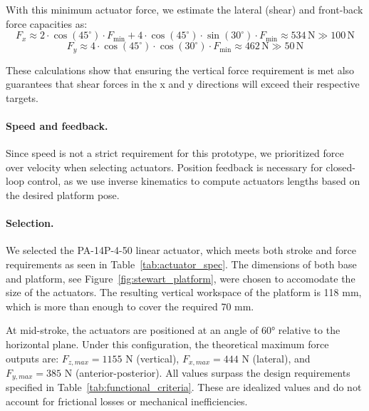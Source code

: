 With this minimum actuator force, we estimate the lateral (shear) and front-back force capacities as:
\begin{equation}
F_{x} \approx 2 \cdot \cos(45^\circ) \cdot F_{\text{min}} + 4 \cdot \cos(45^\circ) \cdot \sin(30^\circ) \cdot F_{\text{min}} \approx 534\,\text{N} \gg 100\,\text{N}
\end{equation}
\begin{equation}
F_{y} \approx 4 \cdot \cos(45^\circ) \cdot \cos(30^\circ) \cdot F_{\text{min}} \approx 462\,\text{N} \gg 50\,\text{N}
\end{equation}

These calculations show that ensuring the vertical force requirement is met also guarantees that shear forces in the x and y directions will exceed 
their respective targets.
\paragraph{Speed and feedback.}Since speed is not a strict requirement for this prototype, we prioritized force over velocity when selecting actuators. Position feedback is necessary 
for closed-loop control, as we use inverse kinematics to compute actuators lengths based on the desired platform pose.
\paragraph{Selection.}We selected the PA-14P-4-50 linear actuator, which meets both stroke and force requirements as seen in Table~\ref{tab:actuator_spec}. The dimensions 
of both base and platform, see Figure~\ref{fig:stewart_platform}, were chosen to accomodate the size of the actuators. The resulting vertical workspace 
of the platform is 118 mm, which is more than enough to cover the required 70 mm.

At mid-stroke, the actuators are positioned at an angle of 60° relative to the horizontal plane. Under this configuration, the theoretical maximum force 
outputs are: $F_{z,max} = 1155$ N (vertical), $F_{x,max} = 444$ N (lateral), and $F_{y,max} = 385$ N (anterior-posterior). 
All values surpass the design requirements specified in Table~\ref{tab:functional_criteria}. These are idealized values and do not account 
for frictional losses or mechanical inefficiencies.

